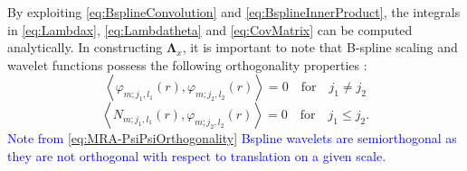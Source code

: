 \documentclass[11pt,draftcls,onecolumn,peerreview]{IEEEtran}
\newcommand{\parham}[1]{\textcolor{blue}{#1}}
\begin{document}
By exploiting \eqref{eq:BsplineConvolution} and \eqref{eq:BsplineInnerProduct}, the integrals in \eqref{eq:Lambdax}, \eqref{eq:Lambdatheta} and \eqref{eq:CovMatrix} can be computed analytically. In constructing $\boldsymbol\Lambda_{x}$, it is important to note that B-spline scaling and wavelet functions possess the following orthogonality properties \cite{Unser1993}: 
\begin{equation}
  \left\langle \varphi_{m;j_1,l_1}(r),\varphi_{m;j_2,l_2}(r)\right\rangle =0  \quad \mathrm{for} \quad j_1\neq j_2
 \label{eq:MRA-PsiPsiOrthogonality} 
 \end{equation}
 \begin{equation}
  \left\langle N_{m;j_1,l_1}(r),\varphi_{m;j_2,l_2}(r)\right\rangle =0  \quad \mathrm{for} \quad j_1\leq j_2.
 \label{eq:MRA-PhiPsiOrthogonality}
 \end{equation}
  \parham{Note from \eqref{eq:MRA-PsiPsiOrthogonality} Bspline wavelets are semiorthogonal as they are not orthogonal with respect to translation on a given scale.} 
\end{document}
